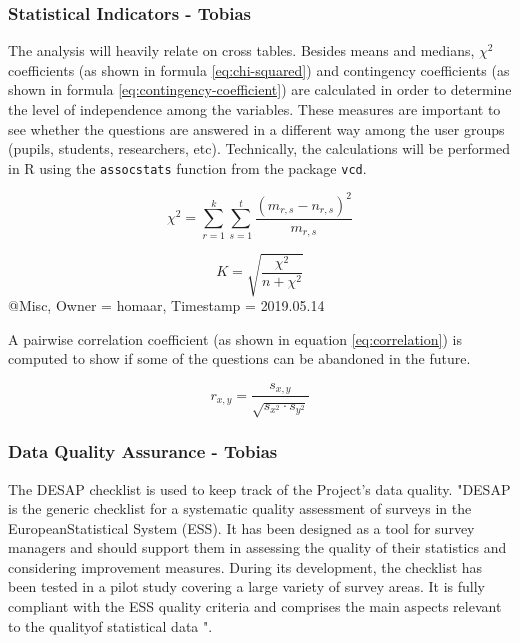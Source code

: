 \documentclass[12pt,a4paper,paper=a4,oneside,titlepage,pdftex]{scrartcl}
\begin{document}
\subsubsection{Statistical Indicators - Tobias}
The analysis will heavily relate on cross tables. Besides means and medians, $\chi^2$ coefficients \cite{doi:10.1080/14786440009463897} (as shown in formula \ref{eq:chi-squared}) and contingency coefficients \cite{pearson1930theory} (as shown in formula \ref{eq:contingency-coefficient}) are calculated in order to determine the level of independence among the variables. These measures are important to see whether the questions are answered in a different way among the user groups (pupils, students, researchers, etc). Technically, the calculations will be performed in R using the \verb|assocstats| function from the package \verb|vcd|.

\begin{equation}
\chi^2 = \sum_{r=1}^{k}\sum_{s=1}^{t}\frac{(m_{r,s}-n_{r,s})^2}{m_{r,s}}
\label{eq:chi-squared}
\end{equation}

\begin{equation}
K = \sqrt{\frac{\chi^2}{n+\chi^2}}
\label{eq:contingency-coefficient}
\end{equation}@Misc{,
  Owner                    = {homaar},
  Timestamp                = {2019.05.14}
}


A pairwise correlation coefficient \cite{lee1988thirteen} (as shown in equation \ref{eq:correlation}) is computed to show if some of the questions can be abandoned in the future.

\begin{equation}
r_{x,y} = \frac{s_{x,y}}{\sqrt{s_{x^2} \cdot s_{y^2}}}
\label{eq:correlation}
\end{equation}




\subsubsection{Data Quality Assurance - Tobias}
The DESAP checklist is used to keep track of the Project's data quality. "DESAP  is  the  generic  checklist  for  a  systematic  quality  assessment  of  surveys  in  the  EuropeanStatistical  System  (ESS).  It  has  been  designed  as  a  tool  for  survey  managers  and  should  support them  in  assessing  the  quality  of  their  statistics  and  considering  improvement  measures.  During  its development, the checklist has been tested in a pilot study covering a large variety of survey areas. It is fully compliant with the ESS quality criteria and comprises the main aspects relevant to the qualityof  statistical  data \cite{desap2019}".
\end{document}
